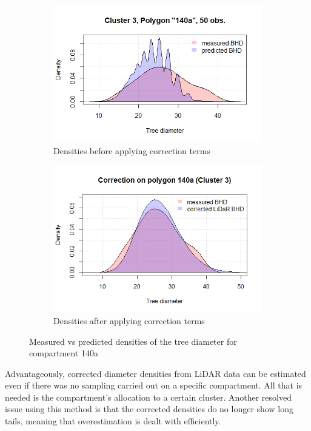 \begin{figure}[H]
\centering
\begin{subfigure}{.5\textwidth}
  \centering
  \includegraphics[width=.9\linewidth]{cluster3_140a_50.png}
  \caption{Densities before applying correction terms}
  \label{fig:polygon_before_140a}
\end{subfigure}%
\begin{subfigure}{.5\textwidth}
  \centering
  \includegraphics[width=0.835\linewidth]{corrected_cluster3_140a.png}
  \caption{Densities after applying correction terms}
  \label{fig:polygon_after_140a}
\end{subfigure}
\caption{Measured vs predicted densities of the tree diameter for compartment 140a}
\label{fig:correction_polygon_140a}
\end{figure}

Advantageously, corrected diameter densities from LiDAR data can be estimated even if there was no sampling carried out on a specific compartment. All that is needed is the compartment's allocation to a certain cluster. Another resolved issue using this method is that the corrected densities do no longer show long tails, meaning that overestimation is dealt with efficiently.